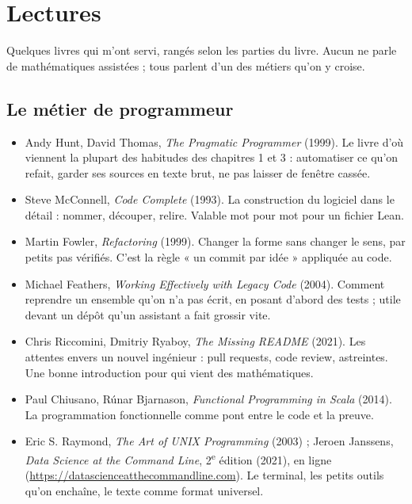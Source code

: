 \chapter{Lectures}

Quelques livres qui m'ont servi, rangés selon les parties du livre. Aucun ne parle de
mathématiques assistées ; tous parlent d'un des métiers qu'on y croise.

\section*{Le métier de programmeur}
\begin{itemize}
  \item Andy Hunt, David Thomas, \emph{The Pragmatic Programmer} (1999). Le livre d'où
        viennent la plupart des habitudes des chapitres 1 et 3 : automatiser ce qu'on refait,
        garder ses sources en texte brut, ne pas laisser de fenêtre cassée.
  \item Steve McConnell, \emph{Code Complete} (1993). La construction du logiciel dans le
        détail : nommer, découper, relire. Valable mot pour mot pour un fichier Lean.
  \item Martin Fowler, \emph{Refactoring} (1999). Changer la forme sans changer le sens, par
        petits pas vérifiés. C'est la règle « un commit par idée » appliquée au code.
  \item Michael Feathers, \emph{Working Effectively with Legacy Code} (2004). Comment
        reprendre un ensemble qu'on n'a pas écrit, en posant d'abord des tests ; utile devant
        un dépôt qu'un assistant a fait grossir vite.
  \item Chris Riccomini, Dmitriy Ryaboy, \emph{The Missing README} (2021). Les attentes envers
        un nouvel ingénieur : pull requests, code review, astreintes. Une bonne
        introduction pour qui vient des mathématiques.
  \item Paul Chiusano, Rúnar Bjarnason, \emph{Functional Programming in Scala} (2014). La
        programmation fonctionnelle comme pont entre le code et la preuve.
  \item Eric S. Raymond, \emph{The Art of UNIX Programming} (2003) ; Jeroen Janssens,
        \emph{Data Science at the Command Line}, 2\textsuperscript{e} édition (2021), en ligne
        (\url{https://datascienceatthecommandline.com}). Le terminal, les petits outils qu'on
        enchaîne, le texte comme format universel.
\end{itemize}

